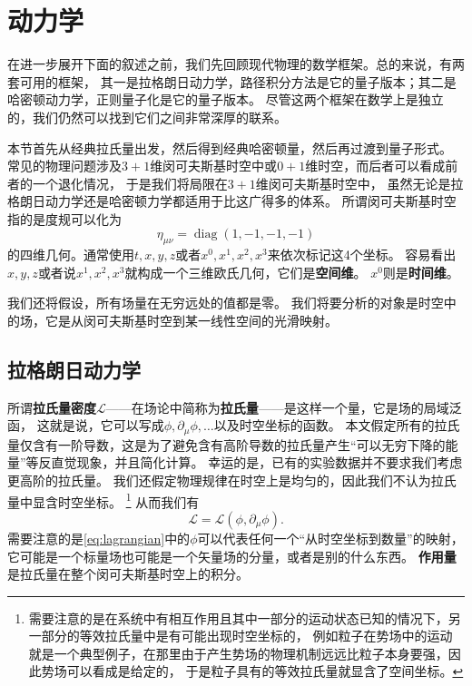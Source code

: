 \documentclass[hyperref, UTF8, a4paper]{ctexart}
\DeclareMathOperator{\diag}{diag}
\begin{document}
\section{动力学}

在进一步展开下面的叙述之前，我们先回顾现代物理的数学框架。总的来说，有两套可用的框架，
其一是拉格朗日动力学，路径积分方法是它的量子版本；其二是哈密顿动力学，正则量子化是它的量子版本。
尽管这两个框架在数学上是独立的，我们仍然可以找到它们之间非常深厚的联系。

本节首先从经典拉氏量出发，然后得到经典哈密顿量，然后再过渡到量子形式。
常见的物理问题涉及$3+1$维闵可夫斯基时空中或$0+1$维时空，而后者可以看成前者的一个退化情况，
于是我们将局限在$3+1$维闵可夫斯基时空中，
虽然无论是拉格朗日动力学还是哈密顿力学都适用于比这广得多的体系。
所谓闵可夫斯基时空指的是度规可以化为
\begin{equation}
    \eta_{\mu\nu} = \diag (1, -1, -1, -1)
\end{equation}
的四维几何。通常使用$t, x, y, z$或者$x^0, x^1, x^2, x^3$来依次标记这4个坐标。
容易看出$x, y, z$或者说$x^1, x^2, x^3$就构成一个三维欧氏几何，它们是\textbf{空间维}。
$x^0$则是\textbf{时间维}。

我们还将假设，所有场量在无穷远处的值都是零。
我们将要分析的对象是时空中的场，它是从闵可夫斯基时空到某一线性空间的光滑映射。

\subsection{拉格朗日动力学}

所谓\textbf{拉氏量密度}$\mathcal{L}$——在场论中简称为\textbf{拉氏量}——是这样一个量，它是场的局域泛函，
这就是说，它可以写成$\phi, \partial_\mu \phi, \ldots$以及时空坐标的函数。
本文假定所有的拉氏量仅含有一阶导数，这是为了避免含有高阶导数的拉氏量产生“可以无穷下降的能量”等反直觉现象，并且简化计算。
幸运的是，已有的实验数据并不要求我们考虑更高阶的拉氏量。
我们还假定物理规律在时空上是均匀的，因此我们不认为拉氏量中显含时空坐标。%
\footnote{
    需要注意的是在系统中有相互作用且其中一部分的运动状态已知的情况下，另一部分的等效拉氏量中是有可能出现时空坐标的，
    例如粒子在势场中的运动就是一个典型例子，在那里由于产生势场的物理机制远远比粒子本身要强，因此势场可以看成是给定的，
    于是粒子具有的等效拉氏量就显含了空间坐标。}%
从而我们有
\begin{equation}
    \mathcal{L} = \mathcal{L}(\phi, \partial_\mu \phi).
    \label{eq:lagrangian}
\end{equation}
需要注意的是\eqref{eq:lagrangian}中的$\phi$可以代表任何一个“从时空坐标到数量”的映射，
它可能是一个标量场也可能是一个矢量场的分量，或者是别的什么东西。
\textbf{作用量}是拉氏量在整个闵可夫斯基时空上的积分。
\end{document}
